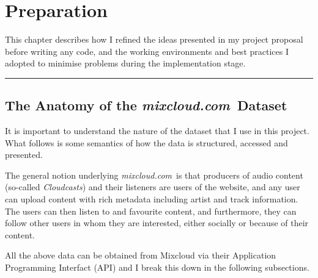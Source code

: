 \documentclass[a4paper,12pt,twoside,notitlepage]{report}
\def\mixurl{\emph{mixcloud.com}}
\newcommand{\rulewidth}{300pt}
\newcommand{\halfrule}{
  \begin{center}
    {\rule{\rulewidth}{0.5pt}}
  \end{center}}
\begin{document}
\chapter{Preparation}

This chapter describes how I refined the ideas presented in my project proposal
before writing any code, and the working environments and best practices I
adopted to minimise problems during the implementation stage.

\halfrule

\section{The Anatomy of the \mixurl\ Dataset}
\label{sec:mix-anatomy}

It is important to understand the nature of the dataset that I use in this
project. What follows is some semantics of how the data is structured, accessed
and presented. 

The general notion underlying \mixurl\ is that producers of audio
content (so-called \emph{Cloudcasts}) and their listeners are users of the
website, and any user can upload content with rich metadata including artist and
track information. The users can then listen to and favourite content, and
furthermore, they can follow other users in whom they are interested, either
socially or because of their content.

All the above data can be obtained from Mixcloud via their Application
Programming Interfact (API) and I break this down in the following subsections.
\end{document}
